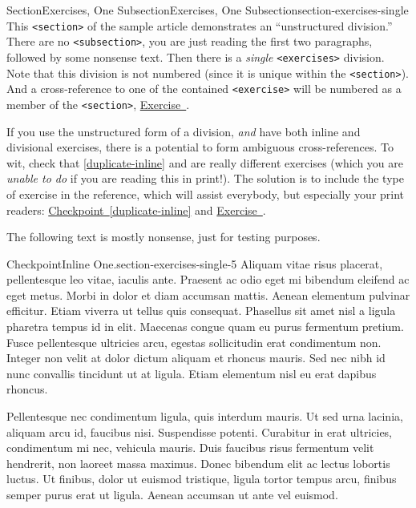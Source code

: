 \documentclass[oneside,10pt,]{article}
\newcommand{\xreffont}{\relax}
\newcommand{\ptxmono}[1]{\texttt{#1}}
\numberwithin{equation}{section}
\begin{document}
\begin{sectionptx}{Section}{Exercises, One Subsection}{}{Exercises, One Subsection}{}{}{section-exercises-single}
This \ptxmono{<section>} of the sample article demonstrates an \textquotedblleft{}unstructured division.\textquotedblright{}  There are no \ptxmono{<subsection>}, you are just reading the first two paragraphs, followed by some nonsense text.  Then there is a \emph{single} \ptxmono{<exercises>} division.  Note that this division is not numbered (since it is unique within the \ptxmono{<section>}).  And a cross-reference to one of the contained \ptxmono{<exercise>} will be numbered as a member of the \ptxmono{<section>}, \hyperlink{exercise-challenging-one-unstructured}{Exercise~{\xreffont 5.4}}.%
\par
If you use the unstructured form of a division, \emph{and} have both inline and divisional exercises, there is a potential to form ambiguous cross-references.  To wit, check that \hyperref[duplicate-inline]{{\xreffont\ref{duplicate-inline}}} and \hyperlink{duplicate-divisional}{{\xreffont 5.2}} are really different exercises (which you are \emph{unable to do} if you are reading this in print!).  The solution is to include the type of exercise in the reference, which will assist everybody, but especially your print readers:  \hyperref[duplicate-inline]{Checkpoint~{\xreffont\ref{duplicate-inline}}} and \hyperlink{duplicate-divisional}{Exercise~{\xreffont 5.2}}.%
\par
The following text is mostly nonsense, just for testing purposes.%
\begin{inlineexercise}{Checkpoint}{Inline One.}{section-exercises-single-5}%
Aliquam vitae risus placerat, pellentesque leo vitae, iaculis ante. Praesent ac odio eget mi bibendum eleifend ac eget metus. Morbi in dolor et diam accumsan mattis. Aenean elementum pulvinar efficitur. Etiam viverra ut tellus quis consequat. Phasellus sit amet nisl a ligula pharetra tempus id in elit. Maecenas congue quam eu purus fermentum pretium. Fusce pellentesque ultricies arcu, egestas sollicitudin erat condimentum non. Integer non velit at dolor dictum aliquam et rhoncus mauris. Sed nec nibh id nunc convallis tincidunt ut at ligula. Etiam elementum nisl eu erat dapibus rhoncus.%
\end{inlineexercise}%
Pellentesque nec condimentum ligula, quis interdum mauris. Ut sed urna lacinia, aliquam arcu id, faucibus nisi. Suspendisse potenti. Curabitur in erat ultricies, condimentum mi nec, vehicula mauris. Duis faucibus risus fermentum velit hendrerit, non laoreet massa maximus. Donec bibendum elit ac lectus lobortis luctus. Ut finibus, dolor ut euismod tristique, ligula tortor tempus arcu, finibus semper purus erat ut ligula. Aenean accumsan ut ante vel euismod.%

\end{sectionptx}
\end{document}

